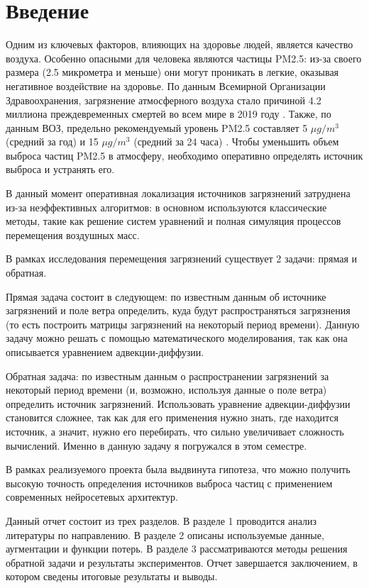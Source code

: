 \documentclass[12pt]{article}
\begin{document}
\section*{Введение}

Одним из ключевых факторов, влияющих на здоровье людей, является качество воздуха. 
Особенно опасными для человека являются частицы PM2.5: из-за своего размера (2.5 микрометра и меньше) они могут проникать в легкие, оказывая негативное воздействие на здоровье. 
По данным Всемирной Организации Здравоохранения, загрязнение атмосферного воздуха стало причиной 4.2 миллиона преждевременных смертей во всем мире в 2019 году \cite{WHO2024}.
Также, по данным ВОЗ, предельно рекомендуемый уровень PM2.5 составляет 5 $\mu g / m^3$ (средний за год) и 15 $\mu g / m^3$ (средний за 24 часа) \cite{WHO2021_aqg}.
Чтобы уменьшить объем выброса частиц PM2.5 в атмосферу, необходимо оперативно определять источник выброса и устранять его.

В данный момент оперативная локализация источников загрязнений затруднена из-за неэффективных алгоритмов: в основном используются классические методы, такие как решение систем уравнений и полная симуляция процессов перемещения воздушных масс. 

В рамках исследования перемещения загрязнений существует 2 задачи: прямая и обратная.

Прямая задача состоит в следующем: по известным данным об источнике загрязнений и поле ветра определить, куда будут распространяться загрязнения (то есть построить матрицы загрязнений на некоторый период времени). Данную задачу можно решать с помощью математического моделирования, так как она описывается уравнением адвекции-диффузии.

Обратная задача: по известным данным о распространении загрязнений за некоторый период времени (и, возможно, используя данные о поле ветра) определить источник загрязнений. Использовать уравнение адвекции-диффузии становится сложнее, так как для его применения нужно знать, где находится источник, а значит, нужно его перебирать, что сильно увеличивает сложность вычислений. 
Именно в данную задачу я погружался в этом семестре.

В рамках реализуемого проекта была выдвинута гипотеза, что можно получить высокую точность определения источников выброса частиц с применением современных нейросетевых архитектур.

Данный отчет состоит из трех разделов. В разделе 1 проводится анализ литературы по направлению. В разделе 2 описаны используемые данные, аугментации и функции потерь. В разделе 3 рассматриваются методы решения обратной задачи и результаты экспериментов. Отчет завершается заключением, в котором сведены итоговые результаты и выводы.
\end{document}
